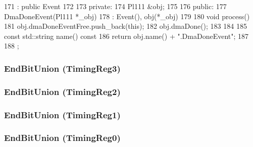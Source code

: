 \begin{DoxyCode}
171                        : public Event
172     {
173       private:
174         Pl111 &obj;
175 
176       public:
177         DmaDoneEvent(Pl111 *_obj)
178             : Event(), obj(*_obj) {}
179 
180         void process() {
181             obj.dmaDoneEventFree.push_back(this);
182             obj.dmaDone();
183         }
184 
185         const std::string name() const {
186             return obj.name() + ".DmaDoneEvent";
187         }
188     };
\end{DoxyCode}
\hypertarget{classPl111_abc7da5ed10e1372b64f2b4e6e8775fd8}{
\subsubsection[{EndBitUnion}]{\setlength{\rightskip}{0pt plus 5cm}EndBitUnion (TimingReg3)}}
\label{classPl111_abc7da5ed10e1372b64f2b4e6e8775fd8}
\hypertarget{classPl111_ae2c8da18642e08cf0a04bb5466b31d49}{
\subsubsection[{EndBitUnion}]{\setlength{\rightskip}{0pt plus 5cm}EndBitUnion (TimingReg2)}}
\label{classPl111_ae2c8da18642e08cf0a04bb5466b31d49}
\hypertarget{classPl111_a19b12e8bc5e6548d8e6b86ed682c16f6}{
\subsubsection[{EndBitUnion}]{\setlength{\rightskip}{0pt plus 5cm}EndBitUnion (TimingReg1)}}
\label{classPl111_a19b12e8bc5e6548d8e6b86ed682c16f6}
\hypertarget{classPl111_ab87617f01d73eb885bbcaf6ae70a63ce}{
\subsubsection[{EndBitUnion}]{\setlength{\rightskip}{0pt plus 5cm}EndBitUnion (TimingReg0)}}
